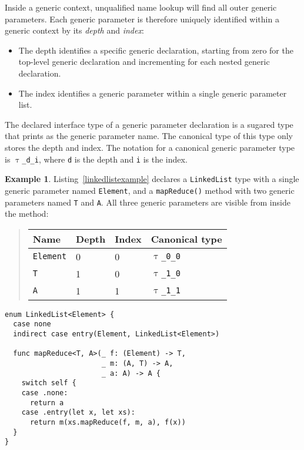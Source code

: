 \documentclass[a4paper,headsepline,bibliography=totoc,toc=flat,fleqn,twoside=semi]{scrbook}
\theoremstyle{definition}
\theoremstyle{definition}
\newtheorem{example}{Example}[chapter]
\theoremstyle{definition}
\newcommand{\ttgp}[2]{\texttt{$\uptau$\_#1\_#2}}
\begin{document}
Inside a generic context, unqualified name lookup will find all outer generic parameters. Each generic parameter is therefore uniquely identified within a generic context by its \emph{depth} and \emph{index}:
\begin{itemize}
\item The depth identifies a specific generic declaration, starting from zero for the top-level generic declaration and incrementing for each nested generic declaration.
\item The index identifies a generic parameter within a single generic parameter list.
\end{itemize}

The declared interface type of a generic parameter declaration is a sugared type that prints as the generic parameter name. The canonical type of this type only stores the depth and index. The notation for a canonical generic parameter type is \ttgp{d}{i}, where \texttt{d} is the depth and \texttt{i} is the index.

\begin{example}
Listing~\ref{linkedlistexample} declares a \texttt{LinkedList} type with a single generic parameter named \texttt{Element}, and a \texttt{mapReduce()} method with two generic parameters named \texttt{T} and \texttt{A}. All three generic parameters are visible from inside the method:
\begin{quote}
\begin{tabular}{|l|l|l|l|}
\hline
Name&Depth&Index&Canonical type\\
\hline
\texttt{Element}&0&0&\ttgp{0}{0}\\
\texttt{T}&1&0&\ttgp{1}{0}\\
\texttt{A}&1&1&\ttgp{1}{1}\\
\hline
\end{tabular}
\end{quote}
\end{example}
\begin{listing}\label{linkedlistexample}
\begin{Verbatim}
enum LinkedList<Element> {
  case none
  indirect case entry(Element, LinkedList<Element>)

  func mapReduce<T, A>(_ f: (Element) -> T,
                       _ m: (A, T) -> A,
                       _ a: A) -> A {
    switch self {
    case .none:
      return a
    case .entry(let x, let xs): 
      return m(xs.mapReduce(f, m, a), f(x))
  }
}
\end{Verbatim}
\end{listing}
\end{document}

